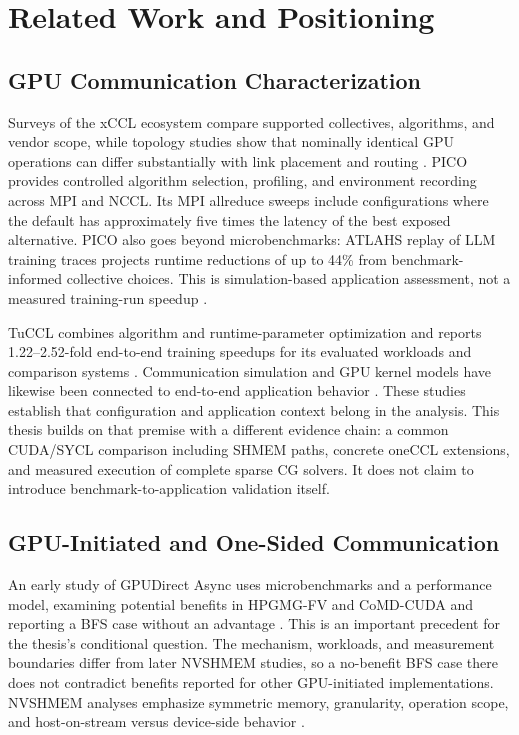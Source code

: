 \chapter{Related Work and Positioning}\label{ch:m-related}

\section{GPU Communication Characterization}

Surveys of the xCCL ecosystem compare supported collectives, algorithms, and vendor scope, while topology studies show that nominally identical GPU operations can differ substantially with link placement and routing \cite{weingram_xccl_2023,li_evaluating_2020}. PICO provides controlled algorithm selection, profiling, and environment recording across MPI and NCCL. Its MPI allreduce sweeps include configurations where the default has approximately five times the latency of the best exposed alternative. PICO also goes beyond microbenchmarks: ATLAHS replay of LLM training traces projects runtime reductions of up to 44\% from benchmark-informed collective choices. This is simulation-based application assessment, not a measured training-run speedup \cite{pasqualoni_pico_2026}.

TuCCL combines algorithm and runtime-parameter optimization and reports 1.22--2.52-fold end-to-end training speedups for its evaluated workloads and comparison systems \cite{li_tuccl_2025}. Communication simulation and GPU kernel models have likewise been connected to end-to-end application behavior \cite{choi_end--end_2020}. These studies establish that configuration and application context belong in the analysis. This thesis builds on that premise with a different evidence chain: a common CUDA/SYCL comparison including SHMEM paths, concrete oneCCL extensions, and measured execution of complete sparse CG solvers. It does not claim to introduce benchmark-to-application validation itself.

\section{GPU-Initiated and One-Sided Communication}

An early study of GPUDirect Async uses microbenchmarks and a performance model, examining potential benefits in HPGMG-FV and CoMD-CUDA and reporting a BFS case without an advantage \cite{agostini_gpudirect_2018}. This is an important precedent for the thesis's conditional question. The mechanism, workloads, and measurement boundaries differ from later NVSHMEM studies, so a no-benefit BFS case there does not contradict benefits reported for other GPU-initiated implementations. NVSHMEM analyses emphasize symmetric memory, granularity, operation scope, and host-on-stream versus device-side behavior \cite{unat_landscape_2026,ma_demystifying_2026}.

